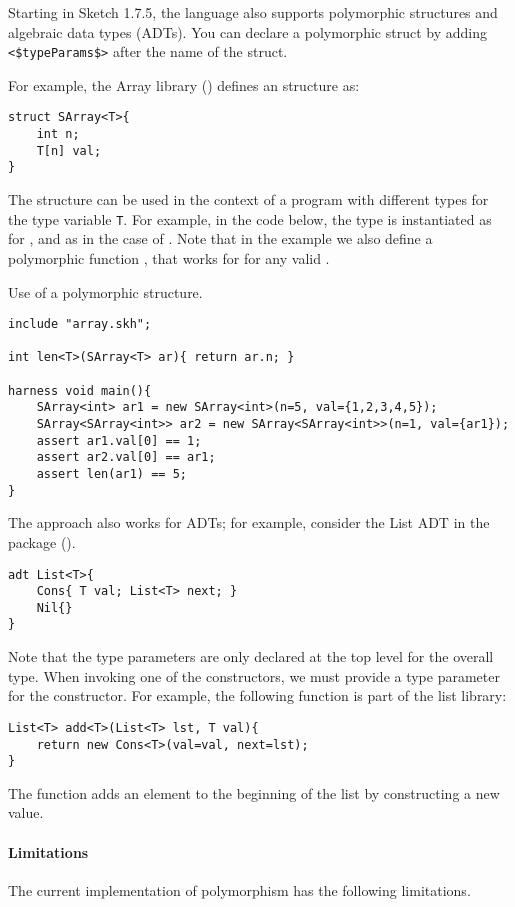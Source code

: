 Starting in Sketch 1.7.5, the language also supports polymorphic structures
and algebraic data types (ADTs). You can declare a polymorphic struct
by adding \lstinline!<$typeParams$>! after the name of the struct.

For example, the Array library () defines an  
structure as:
\begin{lstlisting}
struct SArray<T>{
    int n;
    T[n] val;
}
\end{lstlisting}
The structure can be used in the context of a program with different types
for the type variable \lstinline!T!. For example, in the code below,
the type is instantiated as  for , and as 
in the case of . Note that in the example we also define a
polymorphic function , that works for  for any
valid .

\begin{Example}
Use of a polymorphic structure.
\begin{lstlisting}
include "array.skh";

int len<T>(SArray<T> ar){ return ar.n; }

harness void main(){
    SArray<int> ar1 = new SArray<int>(n=5, val={1,2,3,4,5});
    SArray<SArray<int>> ar2 = new SArray<SArray<int>>(n=1, val={ar1});
    assert ar1.val[0] == 1;
    assert ar2.val[0] == ar1;
    assert len(ar1) == 5;
}
\end{lstlisting}
\end{Example}

The approach also works for ADTs; for example, consider the List ADT
in the  package ().
\begin{lstlisting}
adt List<T>{
    Cons{ T val; List<T> next; }
    Nil{}
}
\end{lstlisting}
Note that the type parameters are only declared at the top level for the
overall  type. When invoking one of the constructors, we must
provide a type parameter for the constructor. For example, the following
function is part of the list library:
\begin{lstlisting}
List<T> add<T>(List<T> lst, T val){
    return new Cons<T>(val=val, next=lst);
}
\end{lstlisting}
The function adds an element to the beginning of the list by constructing
a new  value.

\paragraph{Limitations}
The current implementation of polymorphism has the following limitations.

